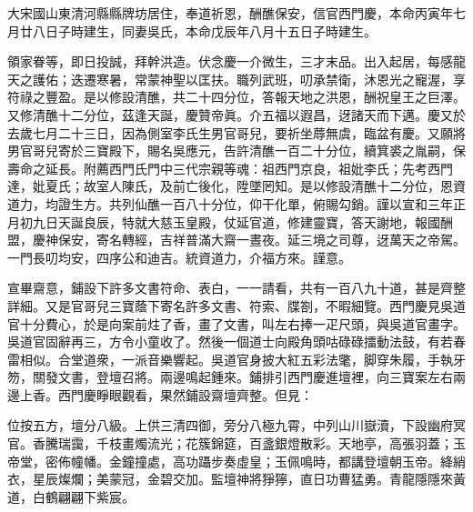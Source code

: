 \begin{myquote}[\markfont]
大宋國山東清河縣縣牌坊居住，奉道祈恩，酬醮保安，信官西門慶，本命丙寅年七月廿八日子時建生，同妻吳氏，本命戊辰年八月十五日子時建生。


領家眷等，即日投誠，拜幹洪造。伏念慶一介微生，三才末品。出入起居，每感龍天之護佑；迭遷寒暑，常蒙神聖以匡扶。職列武班，叨承禁衛，沐恩光之寵渥，享符祿之豐盈。是以修設清醮，共二十四分位，答報天地之洪恩，酬祝皇王之巨澤。又修清醮十二分位，茲逢天誕，慶贊帝眞。介五福以遐昌，迓諸天而下邁。慶又於去歲七月二十三日，因為側室李氏生男官哥兒，要祈坐蓐無虞，臨盆有慶。又願將男官哥兒寄於三寶殿下，賜名吳應元，告許清醮一百二十分位，續箕裘之胤嗣，保壽命之延長。附薦西門氏門中三代宗親等魂：祖西門京良，祖妣李氏；先考西門達，妣夏氏；故室人陳氏，及前亡後化，陞墜罔知。是以修設清醮十二分位，恩資道力，均證生方。共列仙醮一百八十分位，仰干化單，俯賜勾銷。謹以宣和三年正月初九日天誕良辰，特就大慈玉皇殿，仗延官道，修建靈寶，答天謝地，報國酬盟，慶神保安，寄名轉經，吉祥普滿大齋一晝夜。延三境之司尊，迓萬天之帝駕。一門長叨均安，四序公和迪吉。統資道力，介福方來。謹意。
\end{myquote}

宣畢齋意，鋪設下許多文書符命、表白，一一請看，共有一百八九十道，甚是齊整詳細。又是官哥兒三寶蔭下寄名許多文書、符索、牒劄，不暇細覽。西門慶見吳道官十分費心，於是向案前炷了香，畫了文書，叫左右捧一疋尺頭，與吳道官畫字。吳道官固辭再三，方令小童收了。然後一個道士向殿角頭咕碌碌擂動法鼓，有若春雷相似。合堂道衆，一派音樂響起。吳道官身披大紅五彩法氅，脚穿朱履，手執牙笏，關發文書，登壇召將。兩邊鳴起鍾來。鋪排引西門慶進壇裡，向三寶案左右兩邊上香。西門慶睜眼觀看，果然鋪設齋壇齊整。但見：

\begin{myquote}
位按五方，壇分八級。上供三清四御，旁分八極九霄，中列山川嶽瀆，下設幽府冥官。香騰瑞靄，千枝畫燭流光；花簇錦筵，百盞銀燈散彩。天地亭，高張羽蓋；玉帝堂，密佈幢幡。金鐘撞處，高功躡步奏虛皇；玉佩鳴時，都講登壇朝玉帝。絳綃衣，星辰燦爛；美蒙冠，金碧交加。監壇神將猙獰，直日功曹猛勇。青龍隱隱來黃道，白鶴翩翩下紫宸。
\end{myquote}

